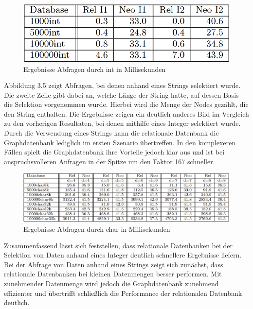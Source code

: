  \citep{graphrelationaldb}
\begin{figure}[H]
	\centering
	\includegraphics[scale=.5]{Illustrations/dbresultsint.png}
	\caption{Ergebnisse Abfragen durch int in Millisekunden \citep{graphrelationaldb}}
\end{figure}
\noindent
Abbildung 3.5 zeigt Abfragen, bei denen anhand eines Strings selektiert wurde. Die zweite Zeile gibt dabei an, welche Länge der String hatte, auf dessen Basis die Selektion vorgenommen wurde. Hierbei wird die Menge der Nodes gezählt, die den String enthalten. Die Ergebnisse zeigen ein deutlich anderes Bild im Vergleich zu den vorherigen Resultaten, bei denen mithilfe eines Integer selektiert wurde. Durch die Verwendung eines Strings kann die relationale Datenbank die Graphdatenbank lediglich im ersten Szenario übertreffen. In den komplexeren Fällen spielt die Graphdatenbank ihre Vorteile jedoch klar aus und ist bei anspruchsvolleren Anfragen in der Spitze um den Faktor 167 schneller.
 \citep{graphrelationaldb}
\begin{figure}[H]
	\centering
	\includegraphics[scale=.425]{Illustrations/dbresultschar.png}
	\caption{Ergebnisse Abfragen durch char in Millisekunden \citep{graphrelationaldb}}
\end{figure}
\noindent
Zusammenfassend lässt sich feststellen, dass relationale Datenbanken bei der Selektion von Daten anhand eines Integer deutlich schnellere Ergebnisse liefern. Bei der Abfrage von Daten anhand eines Strings zeigt sich zunächst, dass relationale Datenbanken bei kleinen Datenmengen besser performen. Mit zunehmender Datenmenge wird jedoch die Graphdatenbank zunehmend effizienter und übertrifft schließlich die Performance der relationalen Datenbank deutlich.
